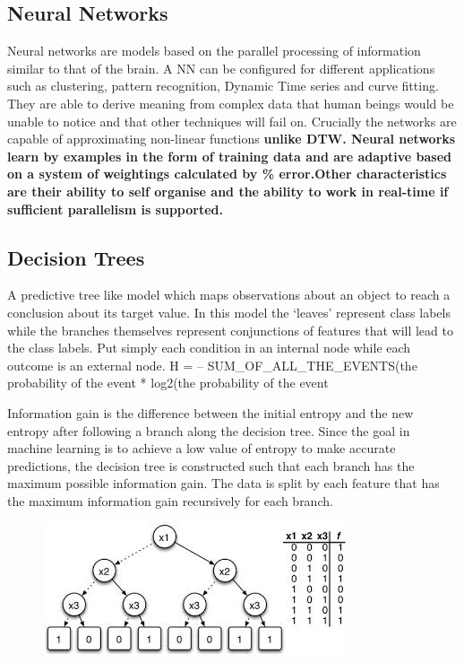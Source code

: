 \subsection{Neural Networks}
Neural networks are models based on the parallel processing of information similar to that of the brain. A NN can be configured for different applications such as clustering, pattern recognition, Dynamic Time series and curve fitting. They are able to derive meaning from complex data that human beings would be unable to notice and that other techniques will fail on. Crucially the networks are capable of approximating non-linear functions \textbf{unlike DTW. Neural networks learn by examples in the form of training data and are adaptive based on a system of weightings calculated by \% error.Other characteristics are their ability to self organise and the ability to work in real-time if sufficient parallelism is supported.}


\subsection{Decision Trees}
A predictive tree like model which maps observations about an object to reach a conclusion about its target value. In this model the `leaves' represent class labels while the branches themselves represent conjunctions of features that will lead to the class labels. Put simply each condition in an internal node while each outcome is an external node. 
{H = – SUM_OF_ALL_THE_EVENTS(the probability of the event * log2(the probability of the event}

Information gain is the difference between the initial entropy and the new entropy after following a branch along the decision tree. Since the goal in machine learning is to achieve a low value of entropy to make accurate predictions, the decision tree is constructed such that each branch has the maximum possible information gain. The data is split by each feature that has the maximum information gain recursively for each branch.



\begin{figure}[h]
    \centering
    \includegraphics[height=0.25\textheight]{fig03/dtree}
    \label{fig:kinect}
\end{figure}


